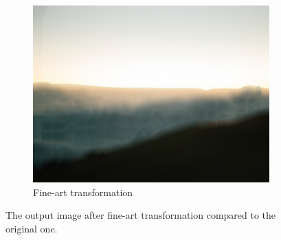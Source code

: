 \documentclass{article}
\begin{document}
\begin{itemize}
\begin{figure}[h]
      \begin{subfigure}{.45\textwidth}
        \includegraphics[width=\linewidth]{./result/labwork10-gpu-out.jpg}
        \caption{Fine-art transformation}
      \end{subfigure}
    \caption{The output image after fine-art transformation compared to the original one.}
    \end{figure}
\end{itemize}
\end{document}
